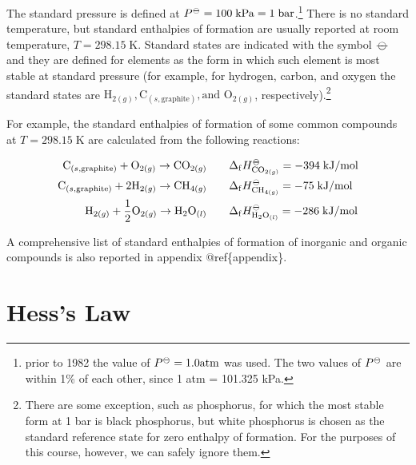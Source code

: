 \documentclass[
]{book}
\theoremstyle{definition}
\theoremstyle{definition}
\theoremstyle{definition}
\theoremstyle{remark}
\begin{document}
The standard pressure is defined at \(P^{{-\kern-6pt{\ominus}\kern-6pt-}} = 100 \; \mathrm{kPa} = 1 \; \mathrm{bar}\).\footnote{prior to 1982 the value of \(P^{{-\kern-6pt{\ominus}\kern-6pt-}} = 1.0 \mathrm{ atm}\) was used. The two values of \(P^{-\kern-6pt{\ominus}\kern-6pt-}\) are within 1\% of each other, since 1 atm = 101.325 kPa.} There is no standard temperature, but standard enthalpies of formation are usually reported at room temperature, \(T = 298.15 \; \mathrm{K}\). Standard states are indicated with the symbol \({-\kern-6pt{\ominus}\kern-6pt-}\) and they are defined for elements as the form in which such element is most stable at standard pressure (for example, for hydrogen, carbon, and oxygen the standard states are \(\mathrm{H}_{2(g)}, \mathrm{C}_{(s,\text{graphite})}, \text{and }\mathrm{O}_{2(g)}\), respectively).\footnote{There are some exception, such as phosphorus, for which the most stable form at 1 bar is black phosphorus, but white phosphorus is chosen as the standard reference state for zero enthalpy of formation. For the purposes of this course, however, we can safely ignore them.}

For example, the standard enthalpies of formation of some common compounds at \(T = 298.15 \; \mathrm{K}\) are calculated from the following reactions:

\begin{equation}
\begin{aligned}
  \mathrm{C}_{(s,\text{graphite})}+\mathrm{O}_{2(g)} \rightarrow \mathrm{CO}_{2(g)} \qquad & \Delta_{\mathrm{f}} H_{\mathrm{CO}_{2(g)}}^{-\kern-6pt{\ominus}\kern-6pt-}= -394 \; \text{kJ/mol} \\
   \mathrm{C}_{(s,\text{graphite})}+2 \mathrm{H}_{2(g)} \rightarrow \mathrm{CH}_{4(g)} \qquad & \Delta_{\mathrm{f}} H_{\mathrm{CH}_{4(g)}}^{-\kern-6pt{\ominus}\kern-6pt-}= -75 \; \text{kJ/mol} \\ 
   \mathrm{H}_{2(g)}+\frac{1}{2} \mathrm{O}_{2(g)} \rightarrow \mathrm{H}_2 \mathrm{O}_{(l)} \qquad & \Delta_{\mathrm{f}} H_{\mathrm{H}_2 \mathrm{O}_{(l)}}^{-\kern-6pt{\ominus}\kern-6pt-}= -286 \; \text{kJ/mol} 
\end{aligned}
\label{eq:someDfH}
\end{equation}

A comprehensive list of standard enthalpies of formation of inorganic and organic compounds is also reported in appendix @ref\{appendix\}.

\hypertarget{hessslaw}{%
\section{Hess's Law}\label{hessslaw}}
\end{document}
